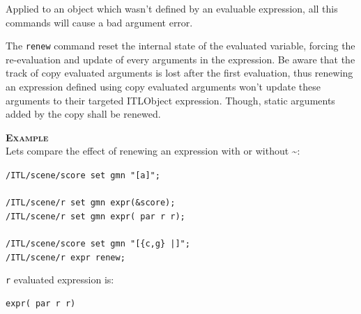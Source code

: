 \documentclass[a4paper,twoside]{report}
\newcommand{\OSC}[1]		{\texttt{#1}}
\newcommand{\example}		{\textbf{\hspace{-1.5cm}\textbf{\textsc{Example }}}}
\newcommand{\lowTilde} 		{\textasciitilde}
\newcommand{\sample}	[1]			{\vspace{-2mm}\begin{center}\colorbox{mygrey}{
								\begin{minipage}[t]{0.9\columnwidth} 
								{\small \texttt{#1}}
								\end{minipage}}\end{center}}
\begin{document}
Applied to an object which wasn't defined by an evaluable expression, all this commands will cause a bad argument error.
\smallbreak

The \OSC{renew} command reset the internal state of the evaluated variable, forcing the re-evaluation and update of every arguments in the expression. Be aware that the track of copy evaluated arguments is lost after the first evaluation, thus renewing an expression defined using copy evaluated arguments won't update these arguments to their targeted ITLObject expression. Though, static arguments added by the copy shall be renewed.
\pagebreak

\example\\
Lets compare the effect of renewing an expression with or without \lowTilde:
\begin{multicols}{2}


\sample{/ITL/scene/score set gmn "[a]";\\
\\
/ITL/scene/r set gmn expr(\&score);\\
/ITL/scene/r set gmn expr( par r r);\\
\\
/ITL/scene/score set gmn "[\{c,g\} |]";\\
/ITL/scene/r expr renew;
}
\OSC{r} evaluated expression is:
\begin{verbatim}
expr( par r r)
\end{verbatim}


\end{multicols}
\end{document}
